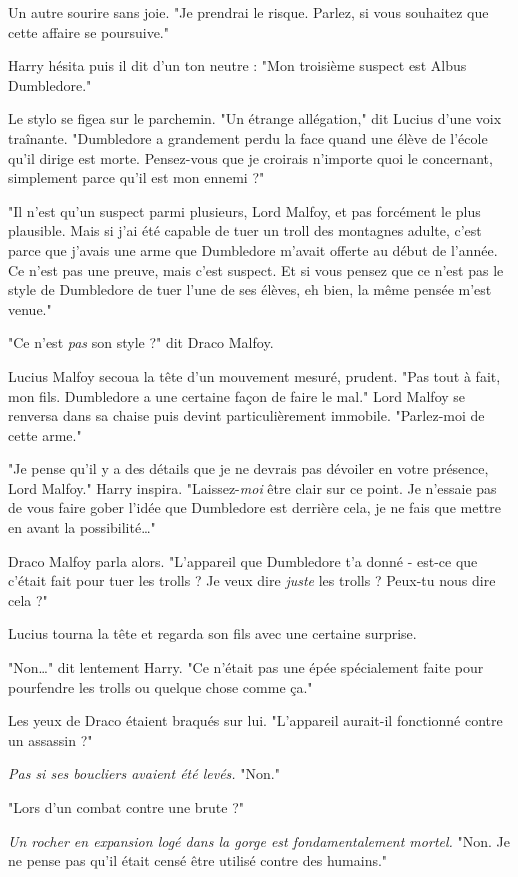 Un autre sourire sans joie. "Je prendrai le risque. Parlez, si vous souhaitez que cette affaire se poursuive."

Harry hésita puis il dit d'un ton neutre : "Mon troisième suspect est Albus Dumbledore."

Le stylo se figea sur le parchemin. "Un étrange allégation," dit Lucius d'une voix traînante. "Dumbledore a grandement perdu la face quand une élève de l'école qu'il dirige est morte. Pensez-vous que je croirais n'importe quoi le concernant, simplement parce qu'il est mon ennemi ?"

"Il n'est qu'un suspect parmi plusieurs, Lord Malfoy, et pas forcément le plus plausible. Mais si j'ai été capable de tuer un troll des montagnes adulte, c'est parce que j'avais une arme que Dumbledore m'avait offerte au début de l'année. Ce n'est pas une preuve, mais c'est suspect. Et si vous pensez que ce n'est pas le style de Dumbledore de tuer l'une de ses élèves, eh bien, la même pensée m'est venue."

"Ce n'est \emph{pas}  son style ?" dit Draco Malfoy.

Lucius Malfoy secoua la tête d'un mouvement mesuré, prudent. "Pas tout à fait, mon fils. Dumbledore a une certaine façon de faire le mal." Lord Malfoy se renversa dans sa chaise puis devint particulièrement immobile. "Parlez-moi de cette arme."

"Je pense qu'il y a des détails que je ne devrais pas dévoiler en votre présence, Lord Malfoy." Harry inspira. "Laissez-\emph{moi}  être clair sur ce point. Je n'essaie pas de vous faire gober l'idée que Dumbledore est derrière cela, je ne fais que mettre en avant la possibilité…"

Draco Malfoy parla alors. "L'appareil que Dumbledore t'a donné - est-ce que c'était fait pour tuer les trolls ? Je veux dire \emph{juste}  les trolls ? Peux-tu nous dire cela ?"

Lucius tourna la tête et regarda son fils avec une certaine surprise.

"Non…" dit lentement Harry. "Ce n'était pas une épée spécialement faite pour pourfendre les trolls ou quelque chose comme ça."

Les yeux de Draco étaient braqués sur lui. "L'appareil aurait-il fonctionné contre un assassin ?"

\emph{Pas si ses boucliers avaient été levés.}  "Non."

"Lors d'un combat contre une brute ?"

\emph{Un rocher en expansion logé dans la gorge est fondamentalement mortel.}  "Non. Je ne pense pas qu'il était censé être utilisé contre des humains."


